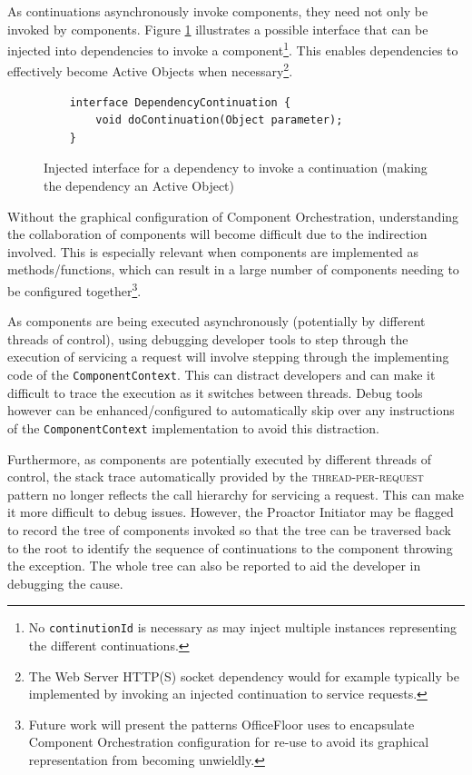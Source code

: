 \documentclass[prodmode]{style/acmlarge}
\begin{document}
As continuations asynchronously invoke components, they need not only be invoked
by components. Figure \ref{fig:DC_interface} illustrates a possible interface
that can be injected into dependencies to invoke a component\footnote{No
\texttt{continutionId} is necessary as may inject multiple instances
representing the different continuations.}.  This enables dependencies to
effectively become Active Objects \cite{active-object} when
necessary\footnote{The Web Server HTTP(S) socket dependency would for example
typically be implemented by invoking an injected continuation to service
requests.}.

\begin{figure}[tp]
\begin{verbatim}
    interface DependencyContinuation {
        void doContinuation(Object parameter);
    }
\end{verbatim}
\caption{Injected interface for a dependency to invoke a continuation (making the dependency an Active Object)}
\label{fig:DC_interface}
\end{figure}

Without the graphical configuration of Component Orchestration, understanding
the collaboration of components will become difficult due to the indirection
involved.  This is especially relevant when components are implemented as
methods/functions, which can result in a large number of components needing to
be configured together\footnote{Future work will present the patterns
OfficeFloor \cite{officefloor} uses to encapsulate Component Orchestration
configuration for re-use to avoid its graphical representation from becoming
unwieldly.}.

As components are being executed asynchronously (potentially by different
threads of control), using debugging developer tools to step through the
execution of servicing a request will involve stepping through the implementing
code of the \texttt{ComponentContext}.  This can distract developers and can
make it difficult to trace the execution as it switches between threads. 
Debug tools however can be enhanced/configured to automatically skip over any
instructions of the \texttt{ComponentContext} implementation to avoid this
distraction.

Furthermore, as components are potentially executed by different threads of
control, the stack trace automatically provided by the
\textsc{thread-per-request} pattern no longer reflects the call hierarchy for
servicing a request.  This can make it more difficult to debug issues.  However,
the Proactor Initiator may be flagged to record the tree of components invoked
so that the tree can be traversed back to the root to identify the sequence of
continuations to the component throwing the exception.  The whole tree can also
be reported to aid the developer in debugging the cause.
\end{document}
